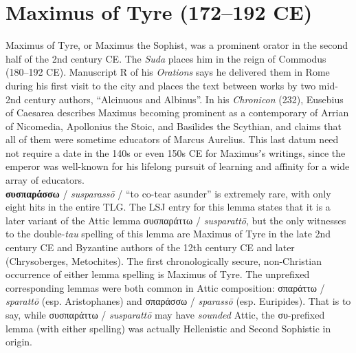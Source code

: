 %
%
\chapter{Maximus of Tyre (172--192 CE)}%
\vspace*{3mm}%
\justifying%
%
\noindent{}Maximus of Tyre, or Maximus the Sophist, %
was a prominent orator in the second half of the 2nd century CE. %
The \textit{Suda} places him in the reign of Commodus (180--192 CE). %
Manuscript R of his \textit{Orations} says he delivered them %
in Rome during his first visit to the city %
and places the text between works by two mid-2nd century authors, %
“Alcinuous and Albinus”. %
In his \textit{Chronicon} (232), %
Eusebius of Caesarea describes Maximus becoming prominent as a contemporary of Arrian of Nicomedia, %
Apollonius the Stoic, and Basilides the Scythian, %
and claims that all of them were sometime educators of Marcus Aurelius. This last datum need not require a date in the 140s or even 150s CE for Maximusʼs writings, %
since the emperor was well-known for his lifelong pursuit of learning and affinity for a wide array of educators. \\[1mm] %

\noindent{}\textbf{συσπαράσσω} / \textit{susparassō} / “to co-tear asunder” %
is extremely rare, with only eight hits in the entire TLG. %
The LSJ entry for this lemma states that it is a later variant of the Attic %
lemma συσπαράττω / \textit{susparattō}, but the only witnesses to the double-\textit{tau} %
spelling of this lemma are Maximus of Tyre in the late 2nd century CE %
and Byzantine authors of the 12th century CE and later (Chrysoberges, Metochites). %
The first chronologically secure, non-Christian occurrence of either lemma spelling %
is Maximus of Tyre. %
The unprefixed corresponding lemmas were both common in Attic composition: %
σπαράττω / \textit{sparattō} (esp. Aristophanes) and σπαράσσω / \textit{sparassō} (esp. Euripides). %
That is to say, while συσπαράττω / \textit{susparattō} may have \textit{sounded} Attic, %
the συ-prefixed lemma (with either spelling) was actually Hellenistic and Second Sophistic in origin. %

